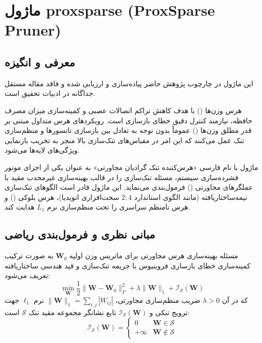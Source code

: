 \section{ماژول proxsparse (ProxSparse Pruner)}
\label{sec:module_proxsparse}

\subsection{معرفی و انگیزه}
این ماژول در چارچوب پژوهش حاضر پیاده‌سازی و ارزیابی شده و فاقد مقاله مستقل جداگانه در ادبیات تحقیق است.

هرس وزن‌ها () با هدف کاهش تراکم اتصالات عصبی و کمینه‌سازی میزان مصرف حافظه، نیازمند کنترل دقیق خطای بازسازی است. رویکردهای هرس متداول مبتنی بر قدر مطلق وزن‌ها () عموماً بدون توجه به تعادل بین بازسازی تانسورها و منظم‌سازی تنک عمل می‌کنند که این امر در مقیاس‌های تنک‌سازی بالا منجر به تخریب بازنمایی ویژگی‌های لایه‌ها می‌شود.

ماژول  با نام فارسی «هرس‌کننده تنک گرادیان مجاورتی» به عنوان یکی از اجزای موتور فشرده‌سازی سیستم، مسئله تنک‌سازی را در قالب بهینه‌سازی غیرمحدب مقید با عملگرهای مجاورتی () فرمول‌بندی می‌نماید. این ماژول قادر است الگوهای تنک‌سازی نیمه‌ساختاریافته  (مانند الگوی استاندارد $2:4$ سخت‌افزاری انویدیا)، هرس بلوکی () و هرس نامنظم سراسری را تحت منظم‌سازی نرم $L_1$ هدایت کند.

\subsection{مبانی نظری و فرمول‌بندی ریاضی}
مسئله بهینه‌سازی هرس مجاورتی برای ماتریس وزن اولیه $\mathbf{W}_0$ به صورت ترکیب کمینه‌سازی خطای بازسازی فروبنیوس با جریمه تنک‌سازی و قید هندسی ساختاریافته تعریف می‌شود:
\begin{equation}
\min_{\mathbf{W}} \frac{1}{2} \|\mathbf{W} - \mathbf{W}_0\|_F^2 + \lambda \|\mathbf{W}\|_1 + \mathcal{I}_{\mathcal{S}}(\mathbf{W})
\end{equation}
که در آن $\lambda > 0$ ضریب منظم‌سازی مجاورتی، $\|\mathbf{W}\|_1 = \sum_{i,j} |W_{ij}|$ نرم $\ell_1$ جهت ترویج تنکی و $\mathcal{I}_{\mathcal{S}}(\mathbf{W})$ تابع نشانگر مجموعه مقید تنک $\mathcal{S}$ است:
\begin{equation}
\mathcal{I}_{\mathcal{S}}(\mathbf{W}) = \begin{cases} 0 & \mathbf{W} \in \mathcal{S} \\ +\infty & \mathbf{W} \notin \mathcal{S} \end{cases}
\end{equation}

